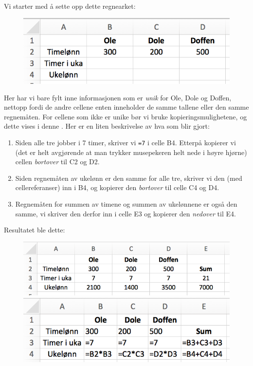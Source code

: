 Vi starter med å sette opp dette regnearket:
\begin{figure}[H]
	\centering
	\includegraphics[scale=0.3]{figs/ex7}\qquad
\end{figure}
Her har vi bare fylt inne informasjonen som er \textit{unik} for Ole, Dole og Doffen, nettopp fordi de andre cellene enten inneholder de samme tallene eller den samme regnemåten. For cellene som ikke er unike bør vi bruke kopieringsmulighetene, og dette vises i denne . Her er en liten beskrivelse av hva som blir gjort:
\begin{enumerate}
	\item Siden alle tre jobber i 7 timer, skriver vi {\tt =7} i celle B4. Etterpå kopierer vi (det er helt avgjørende at man trykker musepekeren helt nede i høyre hjørne) cellen \textsl{bortover} til C2 og D2.
	\item Siden regnemåten av ukelønn er den samme for alle tre, skriver vi den (med cellereferanser) inn i B4, og kopierer den \textsl{bortover} til celle C4 og D4.
	\item Regnemåten for summen av timene og summen av ukelønnene er også den samme, vi skriver den derfor inn i celle E3 og kopierer den \textsl{nedover} til E4.
\end{enumerate}
Resultatet ble dette:
\begin{figure}[H]
	\centering
	\includegraphics[scale=0.3]{figs/ex8}\\[5pt]
	\includegraphics[scale=0.3]{figs/ex15}
\end{figure}
